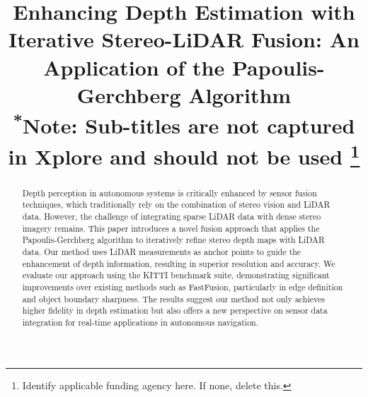 \documentclass[conference]{IEEEtran}
\begin{document}
\title{Enhancing Depth Estimation with Iterative Stereo-LiDAR Fusion: An Application of the Papoulis-Gerchberg Algorithm\\
{\footnotesize \textsuperscript{*}Note: Sub-titles are not captured in Xplore and
should not be used}
\thanks{Identify applicable funding agency here. If none, delete this.}
}

\author{
\and
{}
\and
{}
}

\maketitle

\begin{abstract}
Depth perception in autonomous systems is critically enhanced by sensor fusion techniques, which traditionally rely on the combination of stereo vision and LiDAR data. However, the challenge of integrating sparse LiDAR data with dense stereo imagery remains. This paper introduces a novel fusion approach that applies the Papoulis-Gerchberg algorithm to iteratively refine stereo depth maps with LiDAR data. Our method uses LiDAR measurements as anchor points to guide the enhancement of depth information, resulting in superior resolution and accuracy. We evaluate our approach using the KITTI benchmark suite, demonstrating significant improvements over existing methods such as FastFusion, particularly in edge definition and object boundary sharpness. The results suggest our method not only achieves higher fidelity in depth estimation but also offers a new perspective on sensor data integration for real-time applications in autonomous navigation.
\end{abstract}
\end{document}
